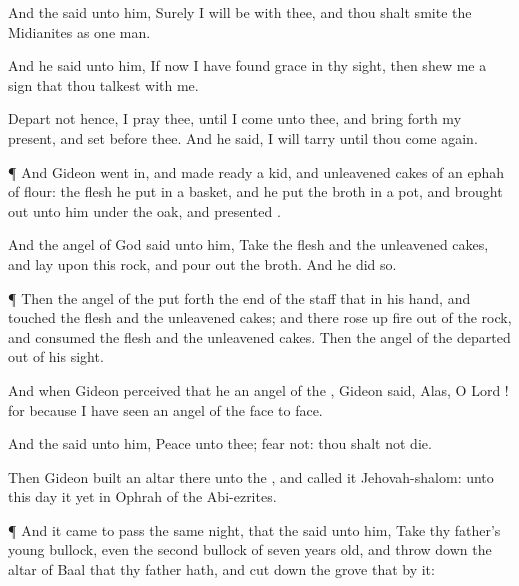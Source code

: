 {And the
{}
said unto him, Surely I will be with thee, and thou shalt
smite the
Midianites as
one
man.

And he
said unto him, If now I have
found
grace in thy
sight, then
shew me a
sign that thou
talkest with me.

Depart not hence, I pray thee, until I
come unto thee, and bring
forth my
present, and
set
{}
before thee. And he
said, I will
tarry until thou come
again.


\par }{\PP {}¶ And
Gideon went
in, and made
ready a
kid, and unleavened
cakes of an
ephah of
flour: the
flesh he
put in a
basket, and he
put the
broth in a
pot, and brought
{}
out unto him under the
oak, and
presented
{}.

And the
angel of
God
said unto him,
Take the
flesh and the unleavened
cakes, and
lay
{} upon
this
rock, and pour
out the
broth. And he
did so.


\par }{\PP {}¶ Then the
angel of the
{} put
forth the
end of the
staff that
{} in his
hand, and
touched the
flesh and the unleavened
cakes; and there rose
up
fire out of the
rock, and
consumed the
flesh and the unleavened
cakes. Then the
angel of the
{}
departed out of his
sight.

And when
Gideon
perceived that he
{} an
angel of the
{},
Gideon
said,
Alas, O
Lord
{}! for
because I have
seen an
angel of the
{}
face to
face.

And the
{}
said unto him,
Peace
{} unto thee;
fear not: thou shalt not
die.

Then
Gideon
built an
altar there unto the
{}, and
called it
Jehovah-shalom: unto this
day it
{} yet in
Ophrah of the
Abi-ezrites.


\par }{\PP {}¶ And it came to pass the same
night, that the
{}
said unto him,
Take thy
father’s
young
bullock, even the
second
bullock of
seven years
old, and throw
down the
altar of
Baal that thy
father hath, and cut
down the
grove that
{} by it:

}

